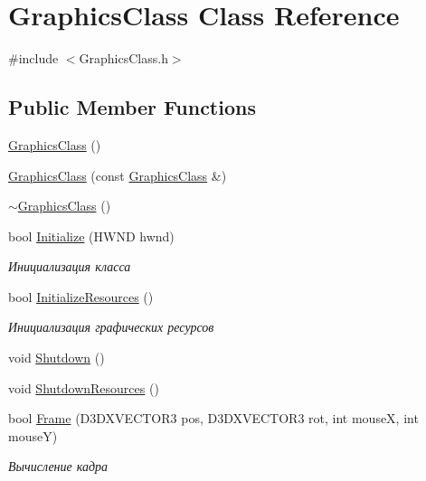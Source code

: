 \hypertarget{class_graphics_class}{}\section{Graphics\+Class Class Reference}
\label{class_graphics_class}


{\ttfamily \#include $<$Graphics\+Class.\+h$>$}

\subsection*{Public Member Functions}
\begin{DoxyCompactItemize}
\item 
\hyperlink{class_graphics_class_abb55af7fd58b928ecade44b2a950415a}{Graphics\+Class} ()
\item 
\hyperlink{class_graphics_class_a46a3311316c5057120e99b48d1921c5b}{Graphics\+Class} (const \hyperlink{class_graphics_class}{Graphics\+Class} \&)
\item 
\hyperlink{class_graphics_class_a234ea791c882c422b59e48fb95099d7a}{$\sim$\+Graphics\+Class} ()
\item 
bool \hyperlink{class_graphics_class_a85d43704202ba0868ead78bbbc8cb04b}{Initialize} (H\+W\+ND hwnd)
\begin{DoxyCompactList}\small\item\em Инициализация класса \end{DoxyCompactList}\item 
bool \hyperlink{class_graphics_class_a4a1ea1f46cf5bb17349c6ccfb7de023c}{Initialize\+Resources} ()
\begin{DoxyCompactList}\small\item\em Инициализация графических ресурсов \end{DoxyCompactList}\item 
void \hyperlink{class_graphics_class_a3f44e9b9083f1d1a5246bb0f2158b1a9}{Shutdown} ()
\item 
void \hyperlink{class_graphics_class_a30ce261248e7e556eca56ad2388ca0ae}{Shutdown\+Resources} ()
\item 
bool \hyperlink{class_graphics_class_a867822704a35c35694e936c527b8c370}{Frame} (D3\+D\+X\+V\+E\+C\+T\+O\+R3 pos, D3\+D\+X\+V\+E\+C\+T\+O\+R3 rot, int mouseX, int mouseY)
\begin{DoxyCompactList}\small\item\em Вычисление кадра \end{DoxyCompactList}\item 

\end{DoxyCompactItemize}
